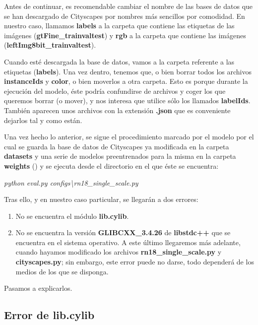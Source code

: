 Antes de continuar, es recomendable cambiar el nombre de las bases de datos que se han descargado de Cityscapes por nombres más sencillos por comodidad. En nuestro caso, llamamos \textbf{labels} a la carpeta que contiene las etiquetas de las imágenes (\textbf{gtFine\_trainvaltest}) y \textbf{rgb} a la carpeta que contiene las imágenes (\textbf{leftImg8bit\_trainvaltest}).

Cuando esté descargada la base de datos, vamos a la carpeta referente a las etiquetas (\textbf{labels}). Una vez dentro, tenemos que, o bien borrar todos los archivos \textbf{instanceIds} y \textbf{color}, o bien moverlos a otra carpeta. Esto es porque durante la ejecución del modelo, éste podría confundirse de archivos y coger los que queremos borrar (o mover), y nos interesa que utilice sólo los llamados \textbf{labelIds}. También aparecen unos archivos con la extensión \textbf{.json} que es conveniente dejarlos tal y como están.

Una vez hecho lo anterior, se sigue el procedimiento marcado por el modelo por el cual se guarda la base de datos de Cityscapes ya modificada en la carpeta \textbf{datasets} y una serie de modelos preentrenados para la misma en la carpeta \textbf{weights} (\cite{github_swiftnet}) y se ejecuta desde el directorio en el que éste se encuentra:

\begin{center}
\textit{python eval.py configs\textbackslash{rn18\_single\_scale.py}}
\end{center}

Tras ello, y en nuestro caso particular, se llegarán a dos errores:

\begin{enumerate}
\item No se encuentra el módulo \textbf{lib.cylib}.
\item No se encuentra la versión \textbf{GLIBCXX\_3.4.26} de \textbf{libstdc++} que se encuentra en el sistema operativo. A este último llegaremos más adelante, cuando hayamos modificado los archivos \textbf{rn18\_single\_scale.py} y \textbf{cityscapes.py}; sin embargo, este error puede no darse, todo dependerá de los medios de los que se disponga.
\end{enumerate}

Pasamos a explicarlos.

\subsection{Error de lib.cylib}

